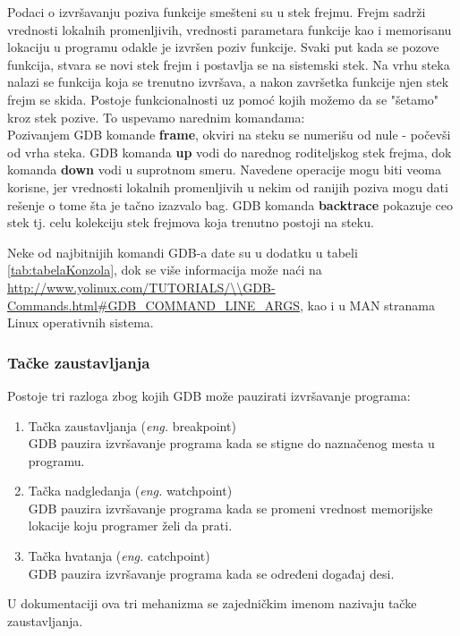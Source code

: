 \documentclass[a4paper]{article}
\begin{document}
Podaci o izvršavanju poziva funkcije smešteni su u stek frejmu. Frejm
sadrži vrednosti lokalnih promenljivih, vrednosti parametara funkcije kao
i memorisanu lokaciju u programu odakle je izvršen poziv funkcije. Svaki
put kada se pozove funkcija, stvara se novi stek frejm i postavlja se na
sistemski stek. Na vrhu steka nalazi se funkcija koja se trenutno izvršava,
a nakon završetka funkcije njen stek frejm se skida.
Postoje funkcionalnosti uz pomoć kojih možemo da se "šetamo" kroz stek pozive.
To uspevamo narednim komandama: \\
\indent Pozivanjem GDB komande \textbf{frame}, okviri na steku se numerišu od nule - počevši
od vrha steka. \newline 
\indent GDB komanda \textbf{up} vodi do narednog roditeljskog stek frejma, dok komanda \textbf{down} 
vodi u suprotnom smeru. Navedene operacije mogu biti veoma korisne, jer vrednosti lokalnih 
promenljivih u nekim od ranijih poziva mogu dati rešenje o tome šta je tačno izazvalo bag\cite{art_debugging}. 
GDB komanda \textbf{backtrace} pokazuje ceo stek tj. celu kolekciju stek frejmova koja trenutno postoji na steku.

Neke od najbitnijih komandi GDB-a date su u dodatku u tabeli \ref{tab:tabelaKonzola}, dok se više informacija
može naći na \url{http://www.yolinux.com/TUTORIALS/\\GDB-Commands.html\#GDB\_COMMAND\_LINE\_ARGS},
kao i u MAN stranama Linux operativnih sistema.

\subsubsection{Tačke zaustavljanja}
\label{subsec:gdbtackezaustavljanja}

Postoje tri razloga zbog kojih GDB može pauzirati izvršavanje programa:\cite{art_debugging}
\begin{enumerate}
\item Tačka zaustavljanja (\textit{eng.} breakpoint) \\
GDB pauzira izvršavanje programa kada se stigne do naznačenog mesta u programu.
\item Tačka nadgledanja (\textit{eng.} watchpoint) \\ 
GDB pauzira izvršavanje programa kada se promeni vrednost memorijske lokacije koju programer želi da prati.
\item Tačka hvatanja (\textit{eng.} catchpoint) \\
GDB pauzira izvršavanje programa kada se određeni događaj desi.
\end{enumerate}
U dokumentaciji ova tri mehanizma se zajedničkim imenom nazivaju tačke zaustavljanja. 
\end{document}
